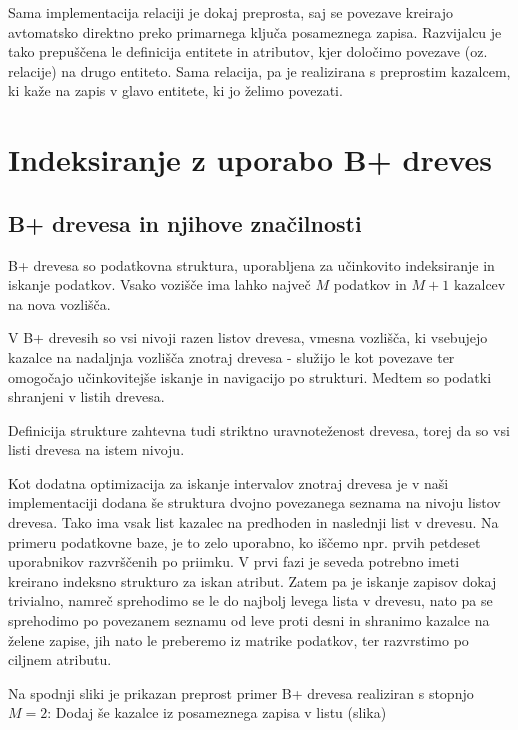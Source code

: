 \documentclass[a4paper,12pt,openright]{book}
\begin{document}
        Sama implementacija relaciji je dokaj preprosta, saj se povezave kreirajo avtomatsko direktno preko primarnega ključa posameznega zapisa. Razvijalcu je tako prepuščena le definicija entitete in atributov, kjer določimo povezave (oz. relacije) na drugo entiteto. Sama relacija, pa je realizirana s preprostim kazalcem, ki kaže na zapis v glavo entitete, ki jo želimo povezati.

    \section{Indeksiranje z uporabo B+ dreves}
        \subsection{B+ drevesa in njihove značilnosti}

        B+ drevesa so podatkovna struktura, uporabljena za učinkovito indeksiranje in iskanje podatkov.
        Vsako vozišče ima lahko največ $M$ podatkov in $M+1$ kazalcev na nova vozlišča.

        V B+ drevesih so vsi nivoji razen listov drevesa, vmesna vozlišča, ki vsebujejo kazalce na nadaljnja vozlišča znotraj drevesa - služijo le kot povezave ter omogočajo učinkovitejše iskanje in navigacijo po strukturi. Medtem so podatki shranjeni v listih drevesa.

        Definicija strukture zahtevna tudi striktno uravnoteženost drevesa, torej da so vsi listi drevesa na istem nivoju.

        Kot dodatna optimizacija za iskanje intervalov znotraj drevesa je v naši implementaciji dodana še struktura dvojno povezanega seznama na nivoju listov drevesa. Tako ima vsak list kazalec na predhoden in naslednji list v drevesu. Na primeru podatkovne baze, je to zelo uporabno, ko iščemo npr. prvih petdeset uporabnikov razvrščenih po priimku. V prvi fazi je seveda potrebno imeti kreirano indeksno strukturo za iskan atribut. Zatem pa je iskanje zapisov dokaj trivialno, namreč sprehodimo se le do najbolj levega lista v drevesu, nato pa se sprehodimo po povezanem seznamu od leve proti desni in shranimo kazalce na želene zapise, jih nato le preberemo iz matrike podatkov, ter razvrstimo po ciljnem atributu.

        Na spodnji sliki je prikazan preprost primer B+ drevesa realiziran s stopnjo $M=2$:
        \colorbox{BurntOrange}{Dodaj še kazalce iz posameznega zapisa v listu (slika)}
        
\end{document}
